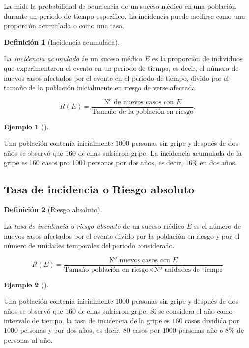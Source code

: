 \documentclass[
  a4paper,
]{scrreport}
\theoremstyle{plain}
\theoremstyle{definition}
\newtheorem{definition}{Definición}[chapter]
\theoremstyle{definition}
\newtheorem{example}{Ejemplo}[chapter]
\theoremstyle{remark}
\begin{document}
La mide la probabilidad de ocurrencia de un suceso médico en una
población durante un periodo de tiempo específico. La incidencia puede
medirse como una proporción acumulada o como una tasa.

\begin{definition}[Incidencia
acumulada]\protect\hypertarget{def-incidencia-acumulada}{}\label{def-incidencia-acumulada}

La \emph{incidencia acumulada} de un suceso médico \(E\) es la
proporción de individuos que experimentaron el evento en un periodo de
tiempo, es decir, el número de nuevos casos afectados por el evento en
el periodo de tiempo, divido por el tamaño de la población inicialmente
en riesgo de verse afectada.

\[R(E)=\frac{\mbox{Nº de nuevos casos con $E$}}{\mbox{Tamaño de la población en riesgo}}.\]

\end{definition}

\begin{example}[]\protect\hypertarget{exm-incidencia-acumulada}{}\label{exm-incidencia-acumulada}

Una población contenía inicialmente \(1000\) personas sin gripe y
después de dos años se observó que \(160\) de ellas sufrieron gripe. La
incidencia acumulada de la gripe es 160 casos pro 1000 personas por dos
años, es decir, 16\% en dos años.

\end{example}

\subsection{Tasa de incidencia o Riesgo
absoluto}\label{tasa-de-incidencia-o-riesgo-absoluto}

\begin{definition}[Riesgo
absoluto]\protect\hypertarget{def-riesgo-absoluto}{}\label{def-riesgo-absoluto}

La \emph{tasa de incidencia} o \emph{riesgo absoluto} de un suceso
médico \(E\) es el número de nuevos casos afectados por el evento divido
por la población en riesgo y por el número de unidades temporales del
periodo considerado.

\[R(E)=\frac{\mbox{Nº nuevos casos con $E$}}{\mbox{Tamaño población en riesgo}\times \mbox{Nº unidades de tiempo}}\]

\end{definition}

\begin{example}[]\protect\hypertarget{exm-riesgo-absoluto}{}\label{exm-riesgo-absoluto}

Una población contenía inicialmente \(1000\) personas sin gripe y
después de dos años se observó que \(160\) de ellas sufrieron gripe. Si
se considera el año como intervalo de tiempo, la tasa de incidencia de
la gripe es \(160\) casos dividida por \(1000\) personas y por dos años,
es decir, \(80\) casos por \(1000\) personas-año o 8\% de personas al
año.

\end{example}
\end{document}
